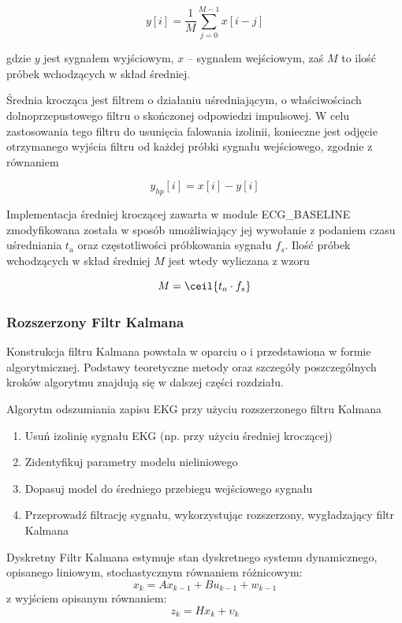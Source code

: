 \begin{equation}
y[i] = \frac{1}{M}\sum_{j=0}^{M-1}x[i - j]
\end{equation}

gdzie $y$ jest sygnałem wyjściowym, $x$ -- sygnałem wejściowym, zaś $M$ to ilość próbek wchodzących w skład średniej. 

Średnia krocząca jest filtrem o działaniu uśredniającym, o właściwościach dolnoprzepustowego filtru o skończonej odpowiedzi impulsowej. W celu zastosowania tego filtru do usunięcia falowania izolinii, konieczne jest odjęcie otrzymanego wyjścia filtru od każdej próbki sygnału wejściowego, zgodnie z równaniem

\begin{equation}
y_{hp}[i] = x[i] - y[i]
\end{equation}

Implementacja średniej kroczącej zawarta w module ECG\_BASELINE zmodyfikowana została w sposób umożliwiający jej wywołanie z podaniem czasu uśredniania $t_a$ oraz częstotliwości próbkowania sygnału $f_s$. Ilość próbek wchodzących w skład średniej $M$ jest wtedy wyliczana z wzoru

\begin{equation}
M = \ceil{t_a \cdot f_s}
\end{equation}


\subsubsection{Rozszerzony Filtr Kalmana}
Konstrukcja filtru Kalmana powstała w oparciu o \cite{Sameni2005-1, Sameni2005-2} i przedstawiona w formie algorytmicznej. Podstawy teoretyczne metody oraz szczegóły poszczególnych kroków algorytmu znajdują się w dalszej części rozdziału.

Algorytm odszumiania zapisu EKG przy użyciu rozszerzonego filtru Kalmana
\begin{enumerate}
\item Usuń izolinię sygnału EKG (np. przy użyciu średniej kroczącej)
\item Zidentyfikuj parametry modelu nieliniowego
\item Dopasuj model do średniego przebiegu wejściowego sygnału
\item Przeprowadź filtrację sygnału, wykorzystując rozszerzony, wygładzający filtr Kalmana
\end{enumerate}

Dyskretny Filtr Kalmana estymuje stan dyskretnego systemu dynamicznego, opisanego liniowym, stochastycznym równaniem różnicowym:
\begin{equation}
 x_k = Ax_{k-1} + Bu_{k-1} + w_{k-1}
\end{equation}
z wyjściem opisanym równaniem:
\begin{equation}
 z_k = Hx_k + \upsilon_k
\end{equation}

